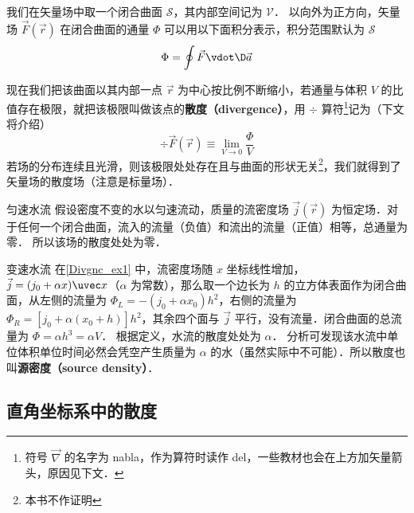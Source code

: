 

我们在矢量场中取一个闭合曲面 $\mathcal{S}$，其内部空间记为 $\mathcal{V}$． 以向外为正方向，矢量场 $\vec F(\vec r)$ 在闭合曲面的通量 $\Phi$ 可以用以下面积分表示，积分范围默认为 $\mathcal{S}$
\begin{equation}
\Phi  = \oint {\vec F \vdot \D\vec a} 
\end{equation}

现在我们把该曲面以其内部一点 $\vec r$ 为中心按比例不断缩小，若通量与体积 $V$ 的比值存在极限，就把该极限叫做该点的\textbf{散度（divergence）}，用 $\div$ 算符\footnote{符号 $\vec\nabla$ 的名字为 nabla，作为算符时读作 del，一些教材也会在上方加矢量箭头，原因见下文．}记为（下文将介绍）
\begin{equation}\label{Divgnc_eq2}
\div \vec F(\vec r) \equiv \lim_{V \to 0} \frac{\Phi }{V}
\end{equation}
若场的分布连续且光滑，则该极限处处存在且与曲面的形状无关\footnote{本书不作证明}，我们就得到了矢量场的散度场（注意是标量场）．

\begin{exam}{匀速水流}\label{Divgnc_ex1}
假设密度不变的水以匀速流动，质量的流密度场 $\vec j(\vec r)$ 为恒定场．对于任何一个闭合曲面，流入的流量（负值）和流出的流量（正值）相等，总通量为零． 所以该场的散度处处为零．
\end{exam}

\begin{exam}{变速水流}
在\autoref{Divgnc_ex1} 中，流密度场随 $x$ 坐标线性增加， $\vec j = ({j_0} + \alpha x)\uvec x$（$\alpha$ 为常数），那么取一个边长为 $h$ 的立方体表面作为闭合曲面，从左侧的流量为 ${\Phi _L} =  - ({j_0} + \alpha {x_0}){h^2}$，右侧的流量为 ${\Phi _R} = [{j_0} + \alpha ({x_0} + h)]{h^2}$，其余四个面与 $\vec j$ 平行，没有流量．闭合曲面的总流量为 $\Phi  = \alpha {h^3} = \alpha V$． 根据定义，水流的散度处处为 $\alpha$． 分析可发现该水流中单位体积单位时间必然会凭空产生质量为 $\alpha$ 的水（虽然实际中不可能）．所以散度也叫\textbf{源密度（source density）}．
\end{exam}

\subsection{直角坐标系中的散度}

